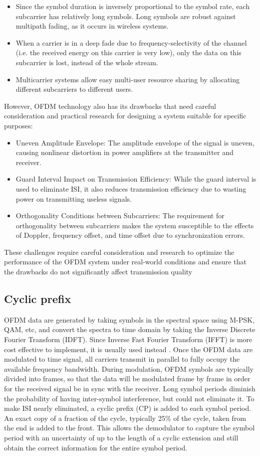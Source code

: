 \begin{itemize}
    \item Since the symbol duration is inversely proportional to the symbol rate, each subcarrier has relatively long symbols. Long symbols are robust against multipath fading, as it occurs in wireless systems.
    \item When a carrier is in a deep fade due to frequency-selectivity of the channel (i.e. the received energy on this carrier is very low), only the data on this subcarrier is lost, instead of the whole stream.
    \item Multicarrier systems allow easy multi-user resource sharing by allocating different subcarriers to different users.
\end{itemize}
However, OFDM technology also has its drawbacks that need careful consideration and practical research for designing a system suitable for specific purposes:
\begin{itemize}
    \item Uneven Amplitude Envelope: The amplitude envelope of the signal is uneven, causing nonlinear distortion in power amplifiers at the transmitter and receiver.
    \item Guard Interval Impact on Transmission Efficiency: While the guard interval is used to eliminate ISI, it also reduces transmission efficiency due to wasting power on transmitting useless signals.
    \item Orthogonality Conditions between Subcarriers: The requirement for orthogonality between subcarriers makes the system susceptible to the effects of Doppler, frequency offset, and time offset due to synchronization errors.
\end{itemize}
These challenges require careful consideration and research to optimize the performance of the OFDM system under real-world conditions and ensure that the drawbacks do not significantly affect transmission quality


\subsection{Cyclic prefix}
OFDM data are generated by taking symbols in the spectral space using M-PSK, QAM, etc, and convert the spectra to time domain by taking the Inverse Discrete Fourier Transform (IDFT). Since Inverse Fast Fourier Transform (IFFT) is more cost effective to implement, it is usually used instead \cite{b3}. Once the OFDM data are modulated to time signal, all carriers transmit in parallel to fully occupy the available frequency bandwidth. During modulation, OFDM symbols are typically divided into frames, so that the data will be modulated frame by frame in order for the received signal be in sync with the receiver. Long symbol periods diminish the probability of having inter-symbol interference, but could not eliminate it. To make ISI nearly eliminated, a cyclic prefix (CP) is added to each symbol period. An exact copy of a fraction of the cycle, typically 25\% of the cycle, taken from the end is added to the front. This allows the demodulator to capture the symbol period with an uncertainty of up to the length of a cyclic extension and still obtain the correct information for the entire symbol period.

